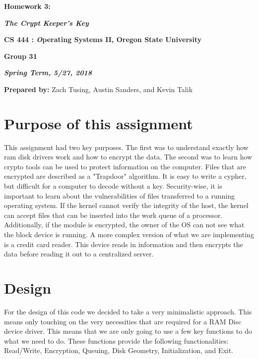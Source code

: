 \documentclass[onecolumn, draftclsnofoot,10pt, compsoc]{IEEEtran}
\def \GroupMemberOne{           Zach Tusing}
\def \GroupMemberTwo{           Austin Sanders}
\def \GroupMemberThree{         Kevin Talik}
\begin{document}
    \begin{center}
    \huge\bf{ Homework 3:} 
   
    \large\textbf{\textit{ The Crypt Keeper's Key }}\par
     
    
    
    \small{\bf CS 444 : \textit Operating Systems II, Oregon State University}\par
    \small{\bf{Group 31}}
    
    
    {\bf\textit{ Spring Term, 5/27, 2018} }
    
    
    {\small {\bf Prepared by:} \GroupMemberOne, \GroupMemberTwo, and \GroupMemberThree }
        \end{center}
        \vfill

       \pagebreak
       \section{ Purpose of this assignment }
        This assignment had two key purposes. The first was to understand exactly how ram disk drivers work and how to encrypt the data. The second was to learn how crypto tools can be used to protect information on the computer. Files that are encrypted are described as a "Trapdoor" algorithm. It is easy to write a cypher, but difficult for a computer to decode without a key.     
        Security-wise, it is important to learn about the vulnerabilities of files transferred to a running operating system. If the kernel cannot verify the integrity of the host, the kernel can accept files that can be inserted into the work queue of a processor. Additionally, if the module is encrypted, the owner of the OS can not see what the block device is running. A more complex version of what we are implementing is a credit card reader. This device reads in information and then encrypts the data before reading it out to a centralized server.
        
    \section{ Design }
    
        For the design of this code we decided to take a very minimalistic approach. This means only touching on the very necessities that are required for a RAM Disc device driver. This means that we are only going to use a few key functions to do what we need to do. These functions provide the following functionalities: Read/Write, Encryption, Queuing, Disk Geometry, Initialization, and Exit.
\end{document}
